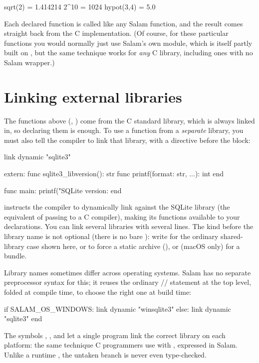 \begin{progout}
sqrt(2)    = 1.414214
2^10       = 1024
hypot(3,4) = 5.0
\end{progout}

Each declared function is called like any Salam function, and the result comes
straight back from the C implementation. (Of course, for these particular
functions you would normally just use Salam's own  module, which is
itself partly built on , but the same technique works for \emph{any}
C library, including ones with no Salam wrapper.)

\section{Linking external libraries}

The functions above (, ) come from the C standard
library, which is always linked in, so declaring them is enough. To use a function
from a \emph{separate} library, you must also tell the compiler to link that
library, with a  directive before the  block:

\begin{salamen}
link dynamic "sqlite3"

extern:
    func sqlite3_libversion(): str
    func printf(format: str, ...): int
end

func main:
    printf("SQLite version: %
end
\end{salamen}

 instructs the compiler to dynamically link against
the SQLite library (the equivalent of passing  to a C compiler),
making its functions available to your  declarations. You can link
several libraries with several  lines. The kind before the library
name is not optional (there is no bare ): write  for
the ordinary shared-library case shown here, or  to force a static
archive (), or (macOS only)  for a
 bundle.

\begin{deep}
Library names sometimes differ across operating systems. Salam has no separate
preprocessor syntax for this; it reuses the ordinary //
statement at the top level, folded at compile time, to choose the right one at
build time:
\begin{salamen}
if SALAM_OS_WINDOWS:
    link dynamic "winsqlite3"
else:
    link dynamic "sqlite3"
end
\end{salamen}
The symbols , , and
 let a single program link the correct library on each
platform: the same technique C programmers use with , expressed in
Salam. Unlike a runtime , the untaken branch is never even type-checked.
\end{deep}

